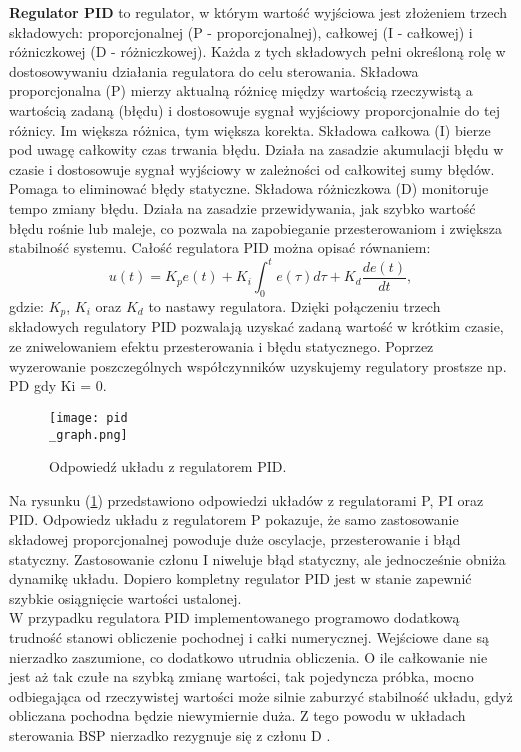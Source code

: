 \textbf{Regulator PID}  to regulator, w którym wartość wyjściowa jest złożeniem trzech składowych: proporcjonalnej (P - proporcjonalnej), całkowej (I - całkowej) i różniczkowej (D - różniczkowej). Każda z tych składowych pełni określoną rolę w dostosowywaniu działania regulatora do celu sterowania.
Składowa proporcjonalna (P) mierzy aktualną różnicę między wartością rzeczywistą a wartością zadaną (błędu) i dostosowuje sygnał wyjściowy proporcjonalnie do tej różnicy. Im większa różnica, tym większa korekta.
Składowa całkowa (I) bierze pod uwagę całkowity czas trwania błędu. Działa na zasadzie akumulacji błędu w czasie i dostosowuje sygnał wyjściowy w zależności od całkowitej sumy błędów. Pomaga to eliminować błędy statyczne.
Składowa różniczkowa (D) monitoruje tempo zmiany błędu. Działa na zasadzie przewidywania, jak szybko wartość błędu rośnie lub maleje, co pozwala na zapobieganie przesterowaniom i zwiększa stabilność systemu.
Całość regulatora PID można opisać równaniem:
\[
	u(t) = K_p e(t) + K_i \int_{0}^{t} e(\tau) d\tau + K_d \frac{de(t)}{dt},
\]
gdzie: $K_p$, $K_i$ oraz $K_d$ to nastawy regulatora. Dzięki połączeniu trzech składowych regulatory PID pozwalają uzyskać zadaną wartość w krótkim czasie, ze zniwelowaniem efektu przesterowania i błędu statycznego. Poprzez wyzerowanie poszczególnych współczynników uzyskujemy regulatory prostsze np. PD gdy Ki = 0.\\

\begin{figure}[!h]
   	\centering
      	\texttt{[image: pid\\\_graph.png]}
      	\caption{Odpowiedź układu z regulatorem PID.}
      	\label{pid_respose}
\end{figure}

Na rysunku (\ref{pid_respose}) przedstawiono odpowiedzi układów z regulatorami P, PI oraz PID. Odpowiedz układu z regulatorem P pokazuje, że samo zastosowanie składowej proporcjonalnej powoduje duże oscylacje, przesterowanie i błąd statyczny. Zastosowanie członu I niweluje błąd statyczny, ale jednocześnie obniża dynamikę układu. Dopiero kompletny regulator PID jest w stanie zapewnić szybkie osiągnięcie wartości ustalonej.\\

W przypadku regulatora PID implementowanego programowo dodatkową trudność stanowi obliczenie pochodnej i całki numerycznej. Wejściowe dane są nierzadko zaszumione, co dodatkowo utrudnia obliczenia. O ile całkowanie nie jest aż tak czułe na szybką zmianę wartości, tak pojedyncza próbka, mocno odbiegająca od rzeczywistej wartości może silnie zaburzyć stabilność układu, gdyż obliczana pochodna będzie niewymiernie duża. Z tego powodu w układach sterowania BSP nierzadko rezygnuje się z członu D \cite{piff} .\\

